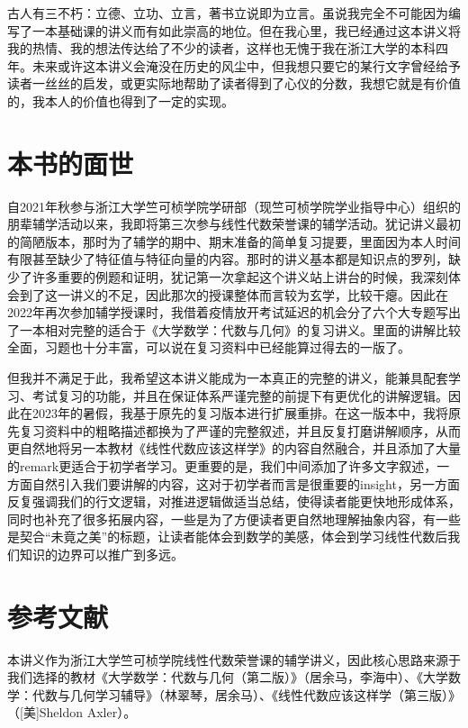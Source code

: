 古人有三不朽：立德、立功、立言，著书立说即为立言。虽说我完全不可能因为编写了一本基础课的讲义而有如此崇高的地位。但在我心里，我已经通过这本讲义将我的热情、我的想法传达给了不少的读者，这样也无愧于我在浙江大学的本科四年。未来或许这本讲义会淹没在历史的风尘中，但我想只要它的某行文字曾经给予读者一丝丝的启发，或更实际地帮助了读者得到了心仪的分数，我想它就是有价值的，我本人的价值也得到了一定的实现。

\section*{本书的面世}

自2021年秋参与浙江大学竺可桢学院学研部（现竺可桢学院学业指导中心）组织的朋辈辅学活动以来，我即将第三次参与线性代数荣誉课的辅学活动。犹记讲义最初的简陋版本，那时为了辅学的期中、期末准备的简单复习提要，里面因为本人时间有限甚至缺少了特征值与特征向量的内容。那时的讲义基本都是知识点的罗列，缺少了许多重要的例题和证明，犹记第一次拿起这个讲义站上讲台的时候，我深刻体会到了这一讲义的不足，因此那次的授课整体而言较为玄学，比较干瘪。因此在2022年再次参加辅学授课时，我借着疫情放开考试延迟的机会分了六个大专题写出了一本相对完整的适合于《大学数学：代数与几何》的复习讲义。里面的讲解比较全面，习题也十分丰富，可以说在复习资料中已经能算过得去的一版了。

但我并不满足于此，我希望这本讲义能成为一本真正的完整的讲义，能兼具配套学习、考试复习的功能，并且在保证体系严谨完整的前提下有更优化的讲解逻辑。因此在2023年的暑假，我基于原先的复习版本进行扩展重排。在这一版本中，我将原先复习资料中的粗略描述都换为了严谨的完整叙述，并且反复打磨讲解顺序，从而更自然地将另一本教材《线性代数应该这样学》的内容自然融合，并且添加了大量的remark更适合于初学者学习。更重要的是，我们中间添加了许多文字叙述，一方面自然引入我们要讲解的内容，这对于初学者而言是很重要的insight，另一方面反复强调我们的行文逻辑，对推进逻辑做适当总结，使得读者能更快地形成体系，同时也补充了很多拓展内容，一些是为了方便读者更自然地理解抽象内容，有一些是契合``未竟之美''的标题，让读者能体会到数学的美感，体会到学习线性代数后我们知识的边界可以推广到多远。

\section*{参考文献}

本讲义作为浙江大学竺可桢学院线性代数荣誉课的辅学讲义，因此核心思路来源于我们选择的教材《大学数学：代数与几何（第二版）》（居余马，李海中）、《大学数学：代数与几何学习辅导》（林翠琴，居余马）、《线性代数应该这样学（第三版）》（[美]Sheldon Axler）。

